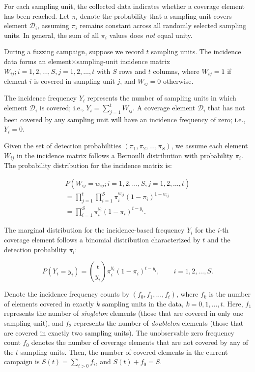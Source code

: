 \documentclass[conference]{IEEEtran}
\begin{document}

For each sampling unit, the collected data indicates whether a coverage element
has been reached. Let $\pi_i$ denote the probability that a sampling unit covers
element $\mathcal{D}_i$, assuming $\pi_i$ remains constant across all randomly
selected sampling units.
In general, the sum of all $\pi_i$ values does \emph{not} equal unity.

During a fuzzing campaign, suppose we record $t$ sampling units. The incidence data forms an element$\times$sampling-unit incidence matrix ${W_{ij};i=1,2,\dots,S,j=1,2,\dots,t}$ with $S$ rows and $t$ columns, where $W_{ij} = 1$ if element $i$ is covered in sampling unit $j$, and $W_{ij} = 0$ otherwise.

The incidence frequency $Y_i$ represents the number of sampling units in which element $\mathcal{D}_i$ is covered; i.e., $Y_i=\sum_{j=1}^{t}W_{ij}$. A coverage element $\mathcal{D}_i$ that has not been covered by any sampling unit will have an incidence frequency of zero; i.e., $Y_i=0$.

Given the set of detection probabilities $(\pi_1,\pi_2,\dots,\pi_S)$, we assume each element $W_{ij}$ in the incidence matrix follows a Bernoulli distribution with probability $\pi_i$. The probability distribution for the incidence matrix is:

\begin{equation}
    \begin{split}
        P(W_{ij}=w_{ij};i=1,2,\dots,S,j=1,2,\dots,t) \\
        = \prod_{j=1}^{t}\prod_{i=1}^{S}\pi_i^{w_{ij}}(1-\pi_i)^{1-w_{ij}} \\
        = \prod_{i=1}^{S}\pi_i^{y_i}(1-\pi_i)^{t-y_i}.
    \end{split}
\end{equation}

The marginal distribution for the incidence-based frequency $Y_i$ for the $i$-th coverage element follows a binomial distribution characterized by $t$ and the detection probability $\pi_i$:

\begin{equation}
    P(Y_i=y_i) = \binom{t}{y_i}\pi_i^{y_i}(1-\pi_i)^{t-y_i}, \qquad i=1,2,\dots,S.
\end{equation}

Denote the incidence frequency counts by $(f_0, f_1, \dots, f_t)$, where $f_k$ is the number of elements covered in exactly $k$ sampling units in the data, $k=0,1,\dots,t$. Here, $f_1$ represents the number of \emph{singleton} elements (those that are covered in only one sampling unit), and $f_2$ represents the number of \emph{doubleton} elements (those that are covered in exactly two sampling units). The unobservable zero frequency count $f_0$ denotes the number of coverage elements that are not covered by any of the $t$ sampling units. Then, the number of covered elements in the current campaign is $S(t)=\sum_{i>0}f_i$, and $S(t)+f_0=S$.
\end{document}
